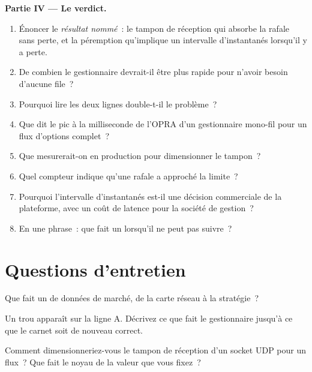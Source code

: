 \begin{problem}
\medskip\noindent\textbf{Partie IV --- Le verdict.}
\begin{enumerate}[resume]
\item Énoncer le \emph{résultat nommé}~: le tampon de réception qui absorbe la rafale sans perte, et la péremption qu'implique
un intervalle d'instantanés lorsqu'il y a perte.
\item De combien le gestionnaire devrait-il être plus rapide pour n'avoir besoin d'aucune file~?
\item Pourquoi lire les deux lignes double-t-il le problème~?
\item Que dit le pic à la milliseconde de l'OPRA d'un gestionnaire mono-fil pour un flux d'options complet~?
\item Que mesurerait-on en production pour dimensionner le tampon~?
\item Quel compteur indique qu'une rafale a approché la limite~?
\item Pourquoi l'intervalle d'instantanés est-il une décision commerciale de la plateforme, avec un coût de latence pour la société de gestion~?
\item En une phrase~: que fait un  lorsqu'il ne peut pas suivre~?
\end{enumerate}
\end{problem}

\section{Questions d'entretien}

\begin{interviewq}\label{iq:ll:the-feed-handler:1}
Que fait un  de données de marché, de la carte réseau à la stratégie~?
\end{interviewq}

\begin{interviewq}\label{iq:ll:the-feed-handler:2}
Un trou apparaît sur la ligne A. Décrivez ce que fait le gestionnaire jusqu'à ce que le carnet soit de nouveau correct.
\end{interviewq}

\begin{interviewq}\label{iq:ll:the-feed-handler:3}
Comment dimensionneriez-vous le tampon de réception d'un socket UDP pour un flux~? Que fait le noyau de la valeur que vous fixez~?
\end{interviewq}

